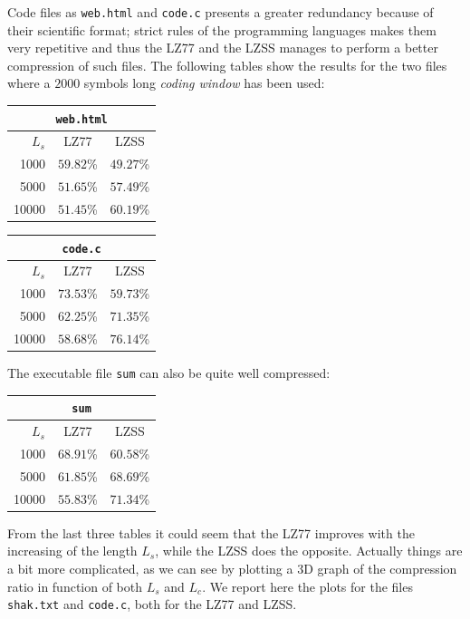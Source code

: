 Code files as \texttt{web.html} and \texttt{code.c} presents a greater redundancy because of their scientific format; strict rules of the programming languages makes them very repetitive and thus the LZ77 and the LZSS manages to perform a better compression of such files. The following tables show the results for the two files where a $2000$ symbols long \textit{coding window} has been used:
\begin{center}
\begin{tabular}{r | c | c |}
\multicolumn{3}{c|}{\texttt{web.html}} \\
\hline
$L_s$ & LZ77 & LZSS \\ \hline
1000 & $59.82$\% & $49.27$\% \\
5000& $51.65$\% & $57.49$\% \\
10000& $51.45$\% & $60.19$\% \\
\hline
\end{tabular}

\vspace{0.5cm}

\begin{tabular}{r | c | c |}
\multicolumn{3}{c|}{\texttt{code.c}} \\
\hline
$L_s$ & LZ77 & LZSS \\ \hline
1000 & $73.53$\% & $59.73$\% \\
5000& $62.25$\% & $71.35$\% \\
10000& $58.68$\% & $76.14$\% \\
\hline
\end{tabular}
\end{center}

The executable file \texttt{sum} can also be quite well compressed:
\begin{center}
\begin{tabular}{r | c | c |}
\multicolumn{3}{c|}{\texttt{sum}} \\ 
\hline
$L_s$ & LZ77 & LZSS \\ \hline
1000 & $68.91$\% & $60.58$\% \\
5000& $61.85$\% & $68.69$\% \\
10000& $55.83$\% & $71.34$\% \\
\hline
\end{tabular}
\end{center}

From the last three tables it could seem that the LZ77 improves with the increasing of the length $L_s$, while the LZSS does the opposite. Actually things are a bit more complicated, as we can see by plotting a 3D graph of the compression ratio in function of both $L_s$ and $L_c$. We report here the plots for the files \texttt{shak.txt} and \texttt{code.c}, both for the LZ77 and LZSS. 

